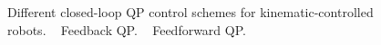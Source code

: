 \begin{figure}[t!]
{		\label{subfig:feedforward QP}}
	\caption{Different closed-loop QP control schemes for kinematic-controlled robots.
		~ Feedback QP.
		~ Feedforward QP.}
	\label{fig:QP scheme for kinematic-control robots}
\end{figure}


